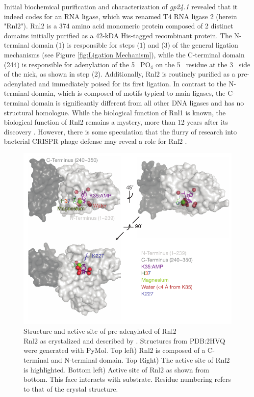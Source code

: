 Initial biochemical purification and characterization of \textit{gp24.1} \citep{Ho2002b} revealed that it indeed codes for an RNA ligase, which was renamed T4 RNA ligase 2 (herein "Rnl2"). Rnl2 is a 374 amino acid monomeric protein composed of 2 distinct domains initially purified as a 42-kDA His-tagged recombinant protein. The N-terminal domain (1) is responsible for steps (1) and (3) of the general ligation mechanisms (see Figure \ref{fig:Ligation Mechanism}), while the C-terminal domain (244) is responsible for adenylation of the 5\textprime~ PO$_{4}$ on the 5\textprime~ residue at the 3\textprime~ side of the nick, as shown in step (2). Additionally, Rnl2 is routinely purified as a pre-adenylated and immediately poised for its first ligation. In contrast to the N-terminal domain, which is composed of motifs typical to main ligases, the C-terminal domain is significantly	different from all other DNA ligases and has no structural homologue. While the biological function of Rnl1 is known, the biological function of Rnl2 remains a mystery, more than 12 years after its discovery \citep{Chauleau2013b}. However, there is some speculation that the flurry of research into bacterial CRISPR phage defense may reveal a role for Rnl2 \citep{Barrangou2007c,Chauleau2013b}.

\begin{figure}[htbp]
	\centering 
	\includegraphics{Figures/Rnl2_Structure.pdf}
	\caption[Structure and active site of pre-adenylated of Rnl2]
	{
		Structure and active site of pre-adenylated of Rnl2\\[0.25cm]
		Rnl2 as crystalized and described by \citep{Nandakumar2006}. Structures from PDB:2HVQ were generated with PyMol. Top left) Rnl2 is composed of a C-terminal and N-terminal domain. Top Right) The active site of Rnl2 is highlighted. Bottom left) Active site of Rnl2 as shown from bottom. This face interacts with substrate. Residue numbering refers to that of the crystal structure.
	}
	\label{fig:Rnl2 General Structure}
\end{figure}

